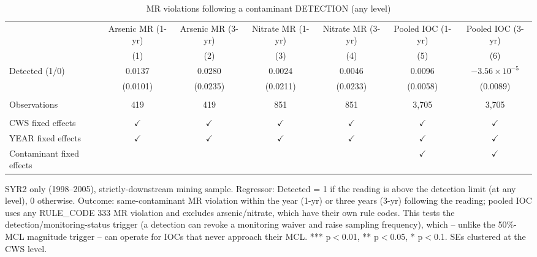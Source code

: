 
\begin{table}[htbp]
\caption{MR violations following a contaminant DETECTION (any level)}\label{tab:mr_detection_lag}
\centering
\begin{adjustbox}{width = \textwidth, center}
   \begin{tabular}{lcccccc}
      \toprule    
                                       & Arsenic MR (1-yr) & Arsenic MR (3-yr)  & Nitrate MR (1-yr) & Nitrate MR (3-yr)  & Pooled IOC (1-yr) & Pooled IOC (3-yr) \\   
                                       & (1)               & (2)                & (3)               & (4)                & (5)               & (6)\\  
      \midrule 
      Detected (1/0)                           & 0.0137            & 0.0280             & 0.0024            & 0.0046             & 0.0096            & $-3.56\times 10^{-5}$\\    
                                       & (0.0101)          & (0.0235)           & (0.0211)          & (0.0233)           & (0.0058)          & (0.0089)\\   
       \\
      Observations                     & 419               & 419                & 851               & 851                & 3,705             & 3,705\\  
       \\
      CWS fixed effects              & $\checkmark$      & $\checkmark$       & $\checkmark$      & $\checkmark$       & $\checkmark$      & $\checkmark$\\   
      YEAR fixed effects               & $\checkmark$      & $\checkmark$       & $\checkmark$      & $\checkmark$       & $\checkmark$      & $\checkmark$\\   
      Contaminant fixed effects  &                   &                    &                   &                    & $\checkmark$      & $\checkmark$\\   
      \bottomrule
   \end{tabular}
\end{adjustbox}
{\tiny\linespread{1}\selectfont \par \raggedright SYR2 only (1998--2005), strictly-downstream mining sample. Regressor: Detected = 1 if the reading is above the detection limit (at any level), 0 otherwise. Outcome: same-contaminant MR violation within the year (1-yr) or three years (3-yr) following the reading; pooled IOC uses any RULE\_CODE 333 MR violation and excludes arsenic/nitrate, which have their own rule codes. This tests the detection/monitoring-status trigger (a detection can revoke a monitoring waiver and raise sampling frequency), which -- unlike the 50\%-MCL magnitude trigger -- can operate for IOCs that never approach their MCL. *** p$<$0.01, ** p$<$0.05, * p$<$0.1. SEs clustered at the CWS level.}
\end{table}
